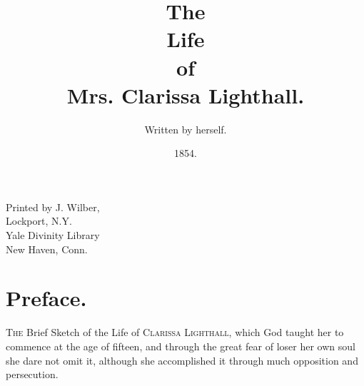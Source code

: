 \documentclass{article}
\title{The\\Life\\of\\Mrs. Clarissa Lighthall.}
\author{Written by herself.}
\date{1854.}
\begin{document}
\maketitle

Printed by J. Wilber,\\
Lockport, N.Y.\\

Yale Divinity Library\\
New Haven, Conn.
\section{Preface.}
\textsc{The} Brief Sketch of the Life of \textsc{Clarissa Lighthall}, which God taught her to commence at the age of fifteen, and through the great fear of loser her own soul she dare not omit it, although she accomplished it through much opposition and persecution.
\end{document}

